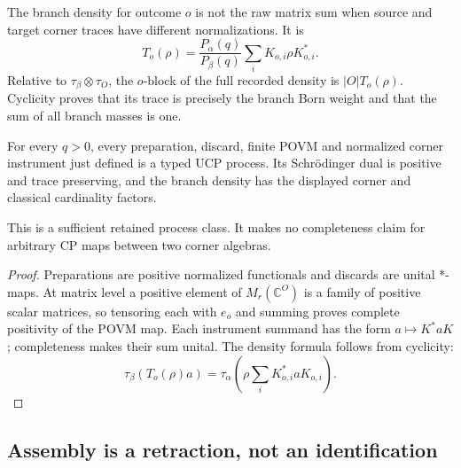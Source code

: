 The branch density for outcome $o$ is not the raw matrix sum when source and
target corner traces have different normalizations.  It is
\[
 T_o(\rho)=\frac{P_\alpha(q)}{P_\beta(q)}
             \sum_iK_{o,i}\rho K_{o,i}^*.
\]
Relative to $\tau_\beta\otimes\tau_O$, the $o$-block of the full recorded
density is $|O|T_o(\rho)$.  Cyclicity proves that its trace is precisely the
branch Born weight and that the sum of all branch masses is one.

\begin{proposition}
{\normalfont\statusProved}\quad
For every $q>0$, every preparation, discard, finite POVM and normalized
corner instrument just defined is a typed UCP process.  Its Schrödinger dual
is positive and trace preserving, and the branch density has the displayed
corner and classical cardinality factors.
\end{proposition}
\begin{scope}
This is a sufficient retained process class.  It makes no completeness claim
for arbitrary CP maps between two corner algebras.
\end{scope}
\begin{proof}
Preparations are positive normalized functionals and discards are unital
*-maps.  At matrix level a positive element of
$M_r(\mathbb C^O)$ is a family of positive scalar matrices, so tensoring each
with $e_o$ and summing proves complete positivity of the POVM map.  Each
instrument summand has the form $a\mapsto K^*aK$; completeness makes their
sum unital.  The density formula follows from cyclicity:
\[
 \tau_\beta(T_o(\rho)a)
 =\tau_\alpha\!\left(\rho\sum_iK_{o,i}^*aK_{o,i}\right).
\]
\end{proof}

\subsection{Assembly is a retraction, not an identification}

